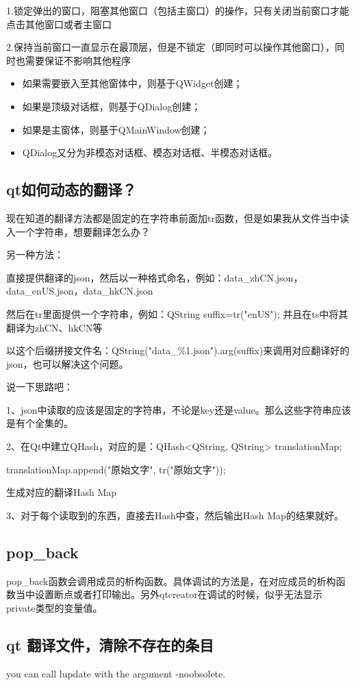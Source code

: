 1.锁定弹出的窗口，阻塞其他窗口（包括主窗口）的操作，只有关闭当前窗口才能点击其他窗口或者主窗口

2.保持当前窗口一直显示在最顶层，但是不锁定（即同时可以操作其他窗口），同时也需要保证不影响其他程序

\begin{itemize}
	\item 如果需要嵌入至其他窗体中，则基于QWidget创建；
	\item 如果是顶级对话框，则基于QDialog创建；
	\item 如果是主窗体，则基于QMainWindow创建；
	\item QDialog又分为非模态对话框、模态对话框、半模态对话框。
\end{itemize}
\subsection{qt如何动态的翻译？}
现在知道的翻译方法都是固定的在字符串前面加tr函数，但是如果我从文件当中读入一个字符串，想要翻译怎么办？

另一种方法：

直接提供翻译的json，然后以一种格式命名，例如：data\_zhCN.json，data\_enUS.json，data\_hkCN.json

然后在tr里面提供一个字符串，例如：QString suffix=tr("enUS"); 并且在ts中将其翻译为zhCN、hkCN等

以这个后缀拼接文件名：QString("data\_\%1.json").arg(suffix)来调用对应翻译好的json，也可以解决这个问题。

说一下思路吧：

1、json中读取的应该是固定的字符串，不论是key还是value。那么这些字符串应该是有个全集的。

2、在Qt中建立QHash，对应的是：QHash<QString, QString> translationMap;

translationMap.append("原始文字", tr("原始文字"));

生成对应的翻译Hash Map

3、对于每个读取到的东西，直接去Hash中查，然后输出Hash Map的结果就好。
\subsection{pop\_back}
pop\_back函数会调用成员的析构函数。具体调试的方法是，在对应成员的析构函数当中设置断点或者打印输出。另外qtcreator在调试的时候，似乎无法显示private类型的变量值。

\subsection{qt 翻译文件，清除不存在的条目}
you can call lupdate with the argument -noobsolete. 
